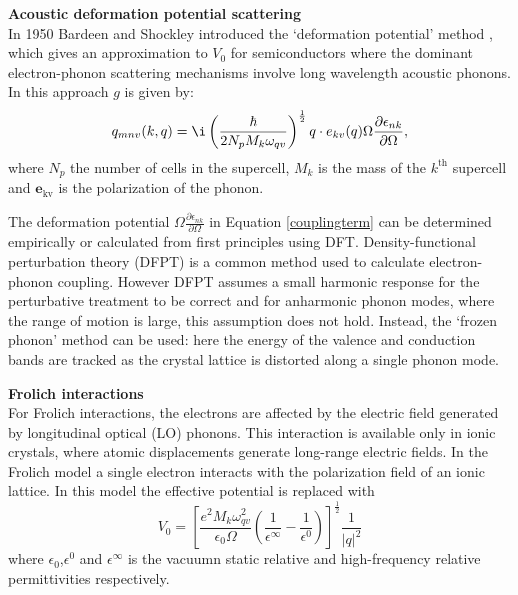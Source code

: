 \textbf{Acoustic deformation potential scattering}\\
 In 1950 Bardeen and Shockley introduced the `deformation potential' method \cite{}, which gives an approximation to $V_0$ for semiconductors where the dominant electron-phonon scattering mechanisms involve long wavelength acoustic phonons.\cite{Giustino2016} In this approach $g$ is given by:
\begin{equation} \label{couplingterm}  %
   q_{mnv}(k,q) = \i\left(\frac{\hbar}{2N_pM_k\omega_{qv}}\right)^{\frac{1}{2}}q\cdot e_{kv}(q) \Omega\frac{\partial\epsilon_{nk}}{\partial\Omega},
\end{equation}
where $N_p$ the number of cells in the supercell, $M_k$ is the mass of the $k^{\textrm{th}}$ supercell and $\textbf{e}_\textrm{{kv}}$ is the polarization of the phonon. 

The deformation potential $\Omega\frac{\partial\epsilon_{nk}}{\partial\Omega}$ in Equation \ref{couplingterm} can be determined empirically or calculated from first principles using DFT. 
Density-functional perturbation theory (DFPT) is a common method used to calculate  electron-phonon  coupling. However DFPT assumes a small harmonic response for the perturbative treatment to be correct and for anharmonic phonon modes, where the range of motion is large, this assumption does not hold.
Instead, the `frozen phonon' method can be used: here the energy of the valence and conduction bands are tracked as the crystal lattice is distorted along a single phonon mode. 

\textbf{Frolich interactions}\\
For Frolich interactions, the electrons are affected by the electric field generated by longitudinal optical (LO) phonons.
This interaction is available only in ionic crystals, where atomic displacements generate long-range electric fields. In the Frolich model a single electron interacts with the polarization field of an ionic lattice.\cite{Giustino2016}
In this model the effective potential is replaced with
\begin{equation}
    V_0 = \left[\frac{e^2M_k\omega^2_{qv}}{\epsilon_0\Omega}\left(\frac{1}{\epsilon^{\infty}}-\frac{1}{\epsilon^0}\right)\right]^{\frac{1}{2}}\frac{1}{|q|^2}
\end{equation}
where $\epsilon_0$,$\epsilon^0$ and $\epsilon^{\infty}$ is the vacuumn static relative and high-frequency relative permittivities respectively.

